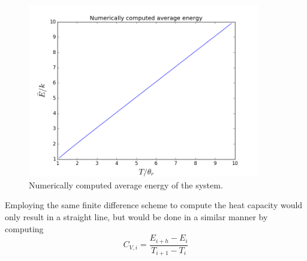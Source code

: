 \documentclass[10pt,a4paper]{amsart}
\begin{document}
\begin{figure}
	\centering
	\includegraphics[width=0.9\textwidth]{figures/numenergy.png}
	\caption{Numerically computed average energy of the system.}
	\label{fig:numenergy}
\end{figure}

Employing the same finite difference scheme to compute the heat capacity would only result in a straight line, but would be done in a similar manner by computing
\begin{equation}
C_{V,i}=\frac{E_{i+h}-E_i}{T_{i+1}-T_i}
\end{equation}
\end{document}
